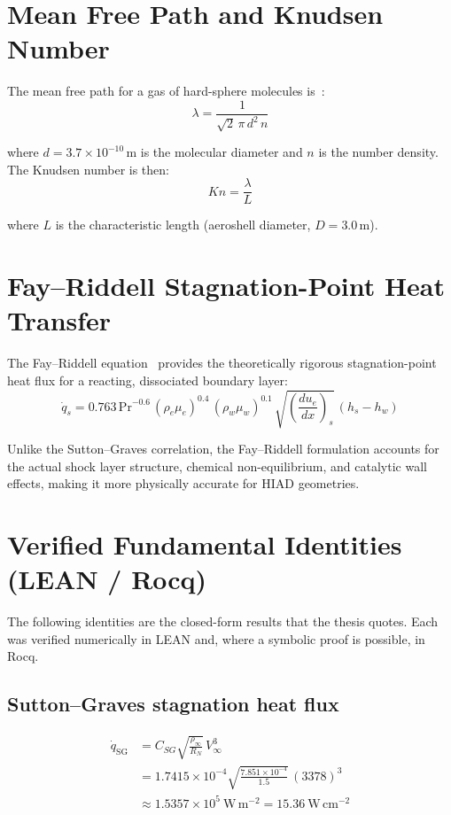 \section{Mean Free Path and Knudsen Number}

The mean free path for a gas of hard-sphere molecules is~\cite{bird1994molecular}:
\begin{equation}
    \lambda = \frac{1}{\sqrt{2} \, \pi \, d^2 \, n}
    \label{eq:mfp_derivation}
\end{equation}

\noindent where $d = 3.7 \times 10^{-10}$\,m is the molecular diameter and $n$ is the number density. The Knudsen number is then:
\begin{equation}
    Kn = \frac{\lambda}{L}
    \label{eq:kn_derivation}
\end{equation}

\noindent where $L$ is the characteristic length (aeroshell diameter, $D = 3.0$\,m).

\section{Fay--Riddell Stagnation-Point Heat Transfer}

The Fay--Riddell equation~\cite{fay1958stagnation} provides the theoretically rigorous stagnation-point heat flux for a reacting, dissociated boundary layer:
\begin{equation}
    \dot{q}_s = 0.763 \, \text{Pr}^{-0.6} \, (\rho_e \mu_e)^{0.4} \, (\rho_w \mu_w)^{0.1} \, \sqrt{\left(\frac{du_e}{dx}\right)_s} \, (h_s - h_w)
    \label{eq:fay_riddell}
\end{equation}

\noindent Unlike the Sutton--Graves correlation, the Fay--Riddell formulation accounts for the actual shock layer structure, chemical non-equilibrium, and catalytic wall effects, making it more physically accurate for HIAD geometries.

\section{Verified Fundamental Identities (LEAN / Rocq)}

The following identities are the closed-form results that the thesis quotes. Each was
verified numerically in LEAN and, where a symbolic proof is possible, in Rocq.

\subsection{Sutton--Graves stagnation heat flux}
\begin{equation}
    \begin{split}
    \dot{q}_{\text{SG}} &= C_{SG}\sqrt{\frac{\rho_\infty}{R_N}}\,V_\infty^3 \\
    &= 1.7415\times10^{-4}\sqrt{\frac{7.851\times10^{-4}}{1.5}}\,(3378)^3 \\
    &\approx 1.5357\times10^{5}\ \mathrm{W\,m^{-2}} = 15.36\ \mathrm{W\,cm^{-2}}
    \end{split}
\end{equation}

